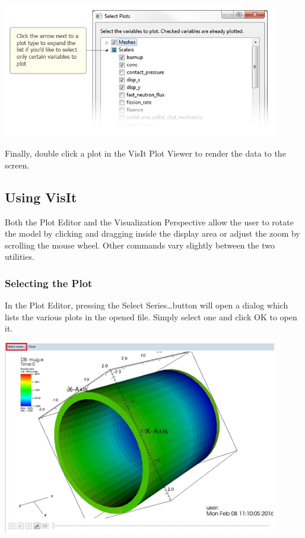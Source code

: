 \documentclass{article}
\begin{document}
\begin{center}
\includegraphics[width=12cm]{images/VisualizationSelectPlots}
\end{center}

Finally, double click a plot in the VisIt Plot Viewer to render the data to the
screen.

\subsection{Using VisIt}

Both the Plot Editor and the Visualization Perspective allow the user to rotate
the model by clicking and dragging inside the display area or adjust the zoom by
scrolling the mouse wheel. Other commands vary slightly between the two
utilities.

\subsubsection{Selecting the Plot}

In the Plot Editor, pressing the Select Series\ldots button will open a dialog
which lists the various plots in the opened file. Simply select one and click OK
to open it. 

\begin{center}
\includegraphics[width=12cm]{images/PlotEditorSelectSeriesButton}
\end{center}
\end{document}
